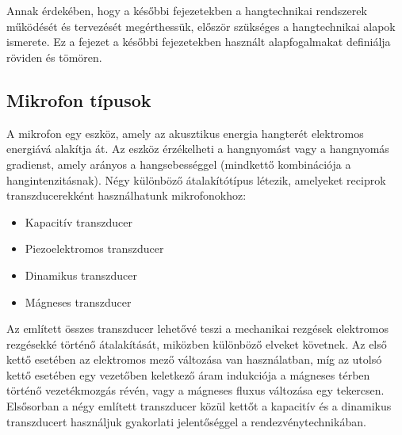 \chapter{\AudioBasics}

Annak érdekében, hogy a későbbi fejezetekben a hangtechnikai rendszerek működését és tervezését megérthessük,
először szükséges a hangtechnikai alapok ismerete. Ez a fejezet a későbbi fejezetekben használt alapfogalmakat definiálja röviden és tömören.


\section{Mikrofon típusok}

A mikrofon egy eszköz, amely az akusztikus energia hangterét elektromos energiává alakítja át.
Az eszköz érzékelheti a hangnyomást vagy a hangnyomás gradienst, amely arányos a hangsebességgel (mindkettő kombinációja a hangintenzitásnak).
Négy különböző átalakítótípus létezik, amelyeket reciprok transzducerekként használhatunk mikrofonokhoz:

\begin{itemize}
    \item Kapacitív transzducer
    \item Piezoelektromos transzducer
    \item Dinamikus transzducer
    \item Mágneses transzducer
\end{itemize}

Az említett összes transzducer lehetővé teszi a mechanikai rezgések elektromos rezgésekké történő átalakítását,
miközben különböző elveket követnek. Az első kettő esetében az elektromos mező változása
van használatban, míg az utolsó kettő esetében egy vezetőben keletkező áram indukciója a mágneses térben történő vezetékmozgás révén,
vagy a mágneses fluxus változása egy tekercsen. 
Elsősorban a négy említett transzducer közül kettőt a kapacitív és a dinamikus transzducert
használjuk gyakorlati jelentőséggel a rendezvénytechnikában.

